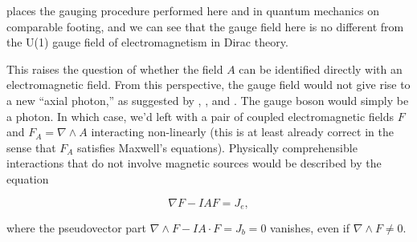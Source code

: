 \documentclass{article}
\begin{document}
  places the gauging procedure performed here and in quantum mechanics on comparable footing, and we can see that the gauge field here is no different from the U(1) gauge field of electromagnetism in Dirac theory.

  This raises the question of whether the field $A$ can be identified directly with an electromagnetic field. From this perspective, the gauge field would not give rise to a new ``axial photon,'' as suggested by \cite{malik}, \cite{naik}, and \cite{pmn}. The gauge boson would simply be a photon. In which case, we'd left with a pair of coupled electromagnetic fields $F$ and $F_A = \nabla \wedge A$ interacting non-linearly (this is at least already correct in the sense that $F_A$ satisfies Maxwell's equations). Physically comprehensible interactions that do not involve magnetic sources would be described by the equation

  \begin{equation}
    \nabla F - I A F = J_e,
  \end{equation}

  where the pseudovector part $\nabla \wedge F - I A \cdot F = J_b = 0$ vanishes, even if $\nabla \wedge F \not= 0$.
\end{document}
